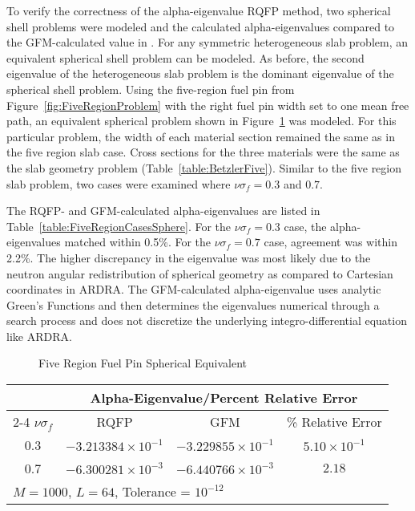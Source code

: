 To verify the correctness of the alpha-eigenvalue RQFP method, two spherical shell problems were modeled and the calculated alpha-eigenvalues compared to the GFM-calculated value in \cite{kornreich_greens_1997}. For any symmetric heterogeneous slab problem, an equivalent spherical shell problem can be modeled. As before, the second eigenvalue of the heterogeneous slab problem is the dominant eigenvalue of the spherical shell problem. Using the five-region fuel pin from Figure~\ref{fig:FiveRegionProblem} with the right fuel pin width set to one mean free path, an equivalent spherical problem shown in Figure~\ref{fig:FiveRegionSphereProblem} was modeled. For this particular problem, the width of each material section remained the same as in the five region slab case. Cross sections for the three materials were the same as the slab geometry problem (Table~\ref{table:BetzlerFive}). Similar to the five region slab problem, two cases were examined where $\nu \sigma_{f} = 0.3$ and $0.7$.

The RQFP- and GFM-calculated alpha-eigenvalues are listed in Table~\ref{table:FiveRegionCasesSphere}. For the $\nu \sigma_{f} = 0.3$ case, the alpha-eigenvalues matched within 0.5\%. For the $\nu \sigma_{f} = 0.7 $ case, agreement was within 2.2\%. The higher discrepancy in the eigenvalue was most likely due to the neutron angular redistribution of spherical geometry as compared to Cartesian coordinates in ARDRA. The GFM-calculated alpha-eigenvalue uses analytic Green's Functions and then determines the eigenvalues numerical through a search process and does not discretize the underlying integro-differential equation like ARDRA.

\begin{figure}[!htbp]
	\centering
	
	\caption{Five Region Fuel Pin Spherical Equivalent \cite{kornreich_timeeigenvalue_2005}}
	\label{fig:FiveRegionSphereProblem}
\end{figure}

\begin{table*}[!htbp]
\centering{}
\caption{Comparison of RQFP- and GFM-calculated Alpha-Eigenvalues for a Three Region Multiplying Sphere}
\label{table:FiveRegionCasesSphere}
\begin{tabular}{@{}cccc@{}}\toprule
& \multicolumn{3}{c}{Alpha-Eigenvalue/Percent Relative Error} \\
\cmidrule{2-4} $\nu \sigma_{f}$ & RQFP & GFM & \% Relative Error \\
\midrule
0.3 & $-3.213384 \times 10^{-1}$ & $-3.229855 \times 10^{-1}$ & $5.10 \times 10^{-1}$ \\ 
0.7 & $-6.300281 \times 10^{-3}$ & $-6.440766 \times 10^{-3}$ & $2.18$ \\ 
\bottomrule
\multicolumn{4}{l}{$M = 1000$, $L = 64$, Tolerance = $10^{-12}$} \\
\end{tabular}
\end{table*}

